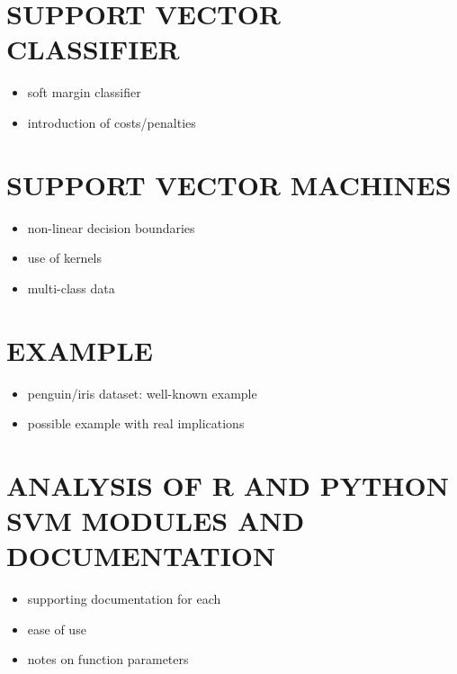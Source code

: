 \documentclass[12pt]{article}
\begin{document}
\section*{SUPPORT VECTOR CLASSIFIER}
\begin{itemize}
    \item soft margin classifier
    \item introduction of costs/penalties
\end{itemize}

\section*{SUPPORT VECTOR MACHINES}
\begin{itemize}
    \item non-linear decision boundaries
    \item use of kernels
    \item multi-class data
\end{itemize}

\section*{EXAMPLE}
\begin{itemize}
    \item penguin/iris dataset: well-known example
    \item possible example with real implications
\end{itemize}

\section*{ANALYSIS OF R AND PYTHON SVM MODULES AND DOCUMENTATION}

\begin{itemize}
    \item supporting documentation for each
    \item ease of use
    \item notes on function parameters
\end{itemize}

\newpage
\thispagestyle{empty}



\end{document}
